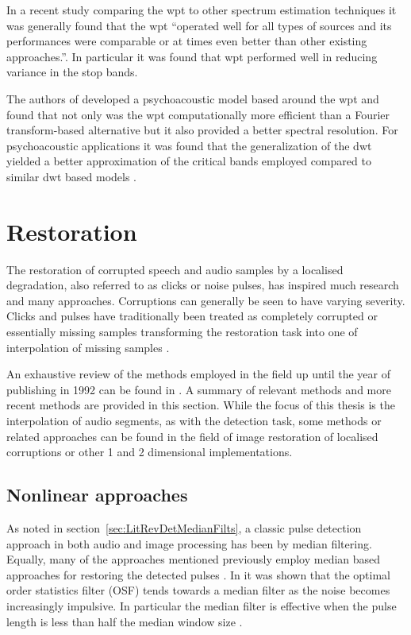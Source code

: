 In a recent study comparing the \gls{wpt} to other spectrum estimation techniques it was generally found that the \gls{wpt} ``operated well for all types of sources and its performances were comparable or at times even better than other existing \linebreak[0]approaches.''\linebreak[2]\cite{Ariananda2013}. In particular it was found that \gls{wpt} performed well in reducing variance in the stop bands.

The authors of \cite{He2008} developed a psychoacoustic model based around the \gls{wpt} and found that not only was the \gls{wpt} computationally more efficient than a Fourier transform-based alternative but it also provided a better spectral resolution. For psychoacoustic applications it was found that the generalization of the \gls{dwt} yielded a better approximation of the critical bands employed \cite{Carnero1999}\cite{He2008} compared to similar \gls{dwt} based models \cite{Sinha1993}\cite{Zurera2001}.

\section{Restoration}\label{sec:LitRev_Restoration}
The restoration of corrupted speech and audio samples by a localised degradation, also referred to as clicks or noise pulses, has inspired much research and many approaches. Corruptions can generally be seen to have varying severity. Clicks and pulses have traditionally been treated as completely corrupted or essentially missing samples transforming the restoration task into one of interpolation of missing samples \cite{Tukey1974}\cite{Tukey1977}\cite{Godsill1998book}.

An exhaustive review of the methods employed in the field up until the year of publishing in 1992 can be found in \cite{Veldhuis1992}. A summary of relevant methods and more recent methods are provided in this section. While the focus of this thesis is the interpolation of audio segments, as with the detection task, some methods or related approaches can be found in the field of image restoration of localised corruptions or other 1 and 2 dimensional implementations.

\subsection{Nonlinear approaches}\label{sec:LitRev_RestorationNonLin}
As noted in section~\ref{sec:LitRevDetMedianFilts}, a classic pulse detection approach in both audio and image processing has been by median filtering. Equally, many of the approaches mentioned previously employ median based approaches for restoring the detected pulses \cite{Tukey1974}\cite{Lee1985}\cite{Heinonen1985}\cite{Heinonen1987}\cite{Maekivirta1991}\cite{Kasparis1993}\cite{Alajlan2004}. In \cite{Bovik1983} it was shown that the optimal order statistics filter (OSF) tends towards a median filter as the noise becomes increasingly impulsive. In particular the median filter is effective when the pulse length is less than half the median window size \cite{Alajlan2004}.

